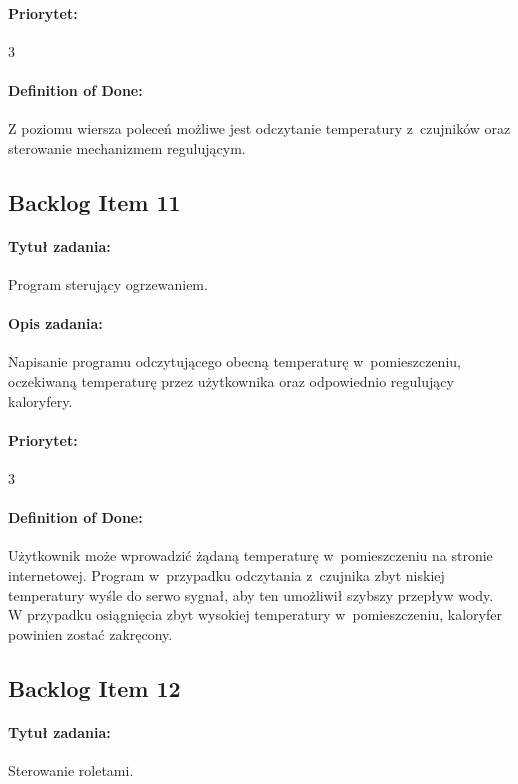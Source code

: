 	\paragraph{Priorytet:}
	3
	
	\paragraph{Definition of Done:} 
	Z poziomu wiersza poleceń możliwe jest odczytanie temperatury z~czujników oraz sterowanie mechanizmem regulującym.
	


\subsection{Backlog Item 11}
\paragraph{Tytuł zadania:}
Program sterujący ogrzewaniem.

\paragraph{Opis zadania:} 
Napisanie programu odczytującego obecną temperaturę w~pomieszczeniu, oczekiwaną temperaturę przez użytkownika oraz odpowiednio regulujący kaloryfery.

\paragraph{Priorytet:}
3

\paragraph{Definition of Done:} 
Użytkownik może wprowadzić żądaną temperaturę w~pomieszczeniu na stronie internetowej. Program w~przypadku odczytania z~czujnika zbyt niskiej temperatury wyśle do serwo sygnał, aby ten umożliwił szybszy przepływ wody. W przypadku osiągnięcia zbyt wysokiej temperatury w~pomieszczeniu, kaloryfer powinien zostać zakręcony. 


	
	\subsection{Backlog Item 12}
	\paragraph{Tytuł zadania:}
	Sterowanie roletami.
	
